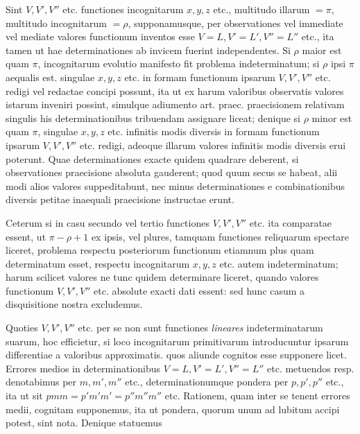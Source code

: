 Sint \(V,V',V''\) etc. functiones incognitarum \(x,y,z\) etc., multitudo illarum \(=\pi\), multitudo incognitarum \(=\rho\), supponamusque, per observationes vel immediate vel mediate valores functionum inventos esse \(V=L,V'=L',V''=L''\) etc., ita tamen ut hae determinationes ab invicem fuerint independentes. Si \(\rho\) maior est quam \(\pi\), incognitarum evolutio manifesto fit problema indeterminatum; si \(\rho\) ipsi \(\pi\) aequalis est. singulae \(x,y,z\) etc. in formam functionum ipsarum \(V,V',V''\) etc. redigi vel redactae concipi possunt, ita ut ex harum valoribus observatis valores istarum inveniri possint, simulque adiumento art. praec. praecisionem relativam singulis his determinationibus tribuendam assignare liceat; denique si \(\rho\) minor est quam \(\pi\), singulae \(x,y,z\) etc. infinitis modis diversis in formam functionum ipsarum \(V,V',V''\) etc. redigi, adeoque illarum valores infinitis modis diversis erui poterunt. Quae determinationes exacte quidem quadrare deberent, si observationes praecisione absoluta gauderent; quod quum secus se habeat, alii modi alios valores suppeditabunt, nec minus determinationes e combinationibus diversis petitae inaequali praecisione instructae erunt.

Ceterum si in casu secundo vel tertio functiones \(V,V',V''\) etc. ita comparatae essent, ut \(\pi-\rho+1\) ex ipsis, vel plures, tamquam functiones reliquarum spectare liceret, problema respectu posteriorum functionum etiamnum plus quam determinatum esset, respectu incognitarum \(x,y,z\) etc. autem indeterminatum; harum scilicet valores ne tunc quidem determinare liceret, quando valores functionum \(V,V',V''\) etc. absolute exacti dati essent: sed hunc casum a disquisitione nostra excludemus.

Quoties \(V,V',V''\) etc. per se non sunt functiones \textit{lineares} indeterminatarum suarum, hoc efficietur, si loco incognitarum primitivarum introducuntur ipsarum differentiae a valoribus approximatis. quos aliunde cognitos esse supponere licet. Errores medios in determinationibus \(V=L,V'=L',V''=L''\) etc. metuendos resp. denotabimus per \(m,m',m''\) etc., determinationumque pondera per \(p,p',p''\) etc., ita ut sit \(pmm=p'm'm'=p''m''m''\) etc. Rationem, quam inter se tenent errores medii, cognitam supponemus, ita ut pondera, quorum unum ad lubitum accipi potest, sint nota. Denique statuemus
